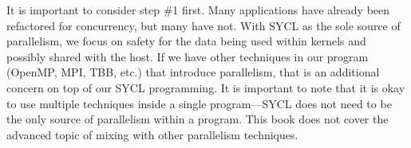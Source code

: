 It is important to consider step \#1 first. Many applications have already been refactored for concurrency, but many have not. With SYCL as the sole source of parallelism, we focus on safety for the data being used within kernels and possibly shared with the host. If we have other techniques in our program (OpenMP, MPI, TBB, etc.) that introduce parallelism, that is an additional concern on top of our SYCL programming. It is important to note that it is okay to use multiple techniques inside a single program—SYCL does not need to be the only source of parallelism within a program. This book does not cover the advanced topic of mixing with other parallelism techniques.\par




















































